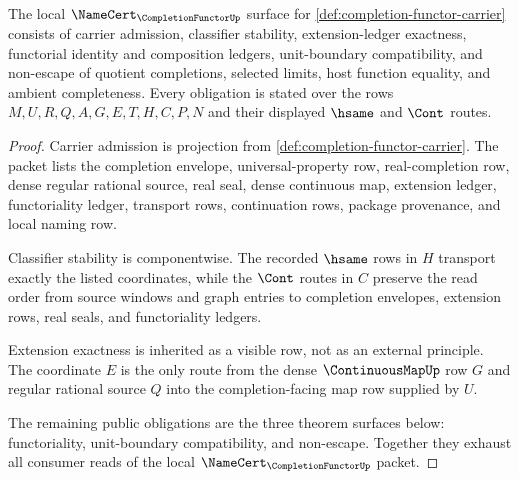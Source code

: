 \begin{theorem}
\label{thm:completion-functor-namecert-obligations}
The local $\NameCert_{\CompletionFunctorUp}$ surface for \autoref{def:completion-functor-carrier} consists of carrier admission, classifier stability, extension-ledger exactness, functorial identity and composition ledgers, unit-boundary compatibility, and non-escape of quotient completions, selected limits, host function equality, and ambient completeness. Every obligation is stated over the rows $M,U,R,Q,A,G,E,T,H,C,P,N$ and their displayed $\hsame$ and $\Cont$ routes.
\end{theorem}
\begin{proof}
Carrier admission is projection from \autoref{def:completion-functor-carrier}. The packet lists the completion envelope, universal-property row, real-completion row, dense regular rational source, real seal, dense continuous map, extension ledger, functoriality ledger, transport rows, continuation rows, package provenance, and local naming row.

Classifier stability is componentwise. The recorded $\hsame$ rows in $H$ transport exactly the listed coordinates, while the $\Cont$ routes in $C$ preserve the read order from source windows and graph entries to completion envelopes, extension rows, real seals, and functoriality ledgers.

Extension exactness is inherited as a visible row, not as an external principle. The coordinate $E$ is the only route from the dense $\ContinuousMapUp$ row $G$ and regular rational source $Q$ into the completion-facing map row supplied by $U$.

The remaining public obligations are the three theorem surfaces below: functoriality, unit-boundary compatibility, and non-escape. Together they exhaust all consumer reads of the local $\NameCert_{\CompletionFunctorUp}$ packet.
\end{proof}

